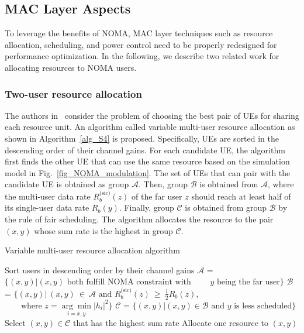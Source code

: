 \subsection{MAC Layer Aspects}
\label{sec_mac}

To leverage the benefits of NOMA, MAC layer techniques such as resource allocation, scheduling, and power control need to be
properly redesigned for performance optimization. In the following, we describe two related work for allocating resources to
NOMA users.

\subsubsection{Two-user resource allocation}
\label{sec_S4}

The authors in~\cite{cite_bell1} consider the problem of choosing the best pair of UEs for sharing each
resource unit. An algorithm called variable multi-user resource allocation as shown in Algorithm~\ref{alg_S4} is proposed.
Specifically, UEs are sorted in the descending order of their channel gains. For each candidate UE, the algorithm first finds the other
UE that can use the same resource based on the simulation model in Fig.~\ref{fig_NOMA_modulation}. The set of UEs that can pair with the candidate UE is obtained as group $\mathcal{A}$. Then, group  $\mathcal{B}$ is obtained from $\mathcal{A}$, where the multi-user data rate $R^{\text{(sic)}}_b(z)$ of the far user $z$ should reach at least half of its single-user data rate $R_b(y)$. Finally, group $\mathcal{C}$ is obtained from group $\mathcal{B}$ by the rule of fair scheduling. The algorithm allocates the resource to the pair $(x, y)$ whose sum rate is the highest in group $\mathcal{C}$.


\begin{algorithm}[t]
\caption{Variable multi-user resource allocation algorithm}
\label{alg_S4}
\begin{algorithmic}
\State Sort users in descending order by their channel gains
  \State $\mathcal{A}$ = $\{(x,y)| (x, y) \text{ both fulfill NOMA constraint with}$
  \State $\text{~~~~~~$y$ being the far user\}}$
  \State $\mathcal{B}$ = $\{(x,y)|~(x, y)~\in~\mathcal{A} \text{ and } R^{\text{(sic)}}_b(z)~\geq~\frac{1}{2}R_b(z)$,
  \State $\text{~~~~~~where } z=\underset{i=x,y}{\arg\min} |h_{i}|^2\}$
  \State $\mathcal{C}$ = $\{(x,y)| (x,y) \in \mathcal{B} \text{ and } y \text{ is less scheduled}\}$
  \State Select $(x, y) \in \mathcal{C}$ that has the highest sum rate
  \State Allocate one resource to $(x, y)$
\EndFor
\end{algorithmic}
\end{algorithm}


